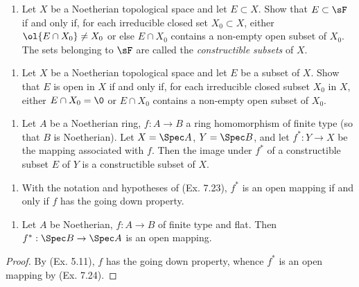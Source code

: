 \documentclass[12pt]{amsart}
\begin{document}
\begin{enumerate}
  \item[7.21] {
      Let $X$ be a Noetherian topological space and let $E\subset X$.
      Show that $E\subset \sF$ if and only if, for each irreducible closed set $X_0\subset X$, either $\ol{E\cap X_0}\neq X_0$ or else $E\cap X_0$ contains a non-empty open subset of $X_0$.
      The sets belonging to $\sF$ are called the \emph{constructible subsets} of $X$.
    }
\end{enumerate}

\begin{enumerate}
  \item[7.22] {
      Let $X$ be a Noetherian topological space and let $E$ be a subset of $X$.
      Show that $E$ is open in $X$ if and only if, for each irreducible closed subset $X_0$ in $X$, either $E\cap X_0=\0$ or $E\cap X_0$ contains a non-empty open subset of $X_0$.
    }
\end{enumerate}

\begin{enumerate}
  \item[7.23] {
      Let $A$ be a Noetherian ring, $f:A\to B$ a ring homomorphism of finite type (so that $B$ is Noetherian).
      Let $X=\Spec A$, $Y=\Spec B$, and let $f^*:Y\to X$ be the mapping associated with $f$.
      Then the image under $f^*$ of a constructible subset $E$ of $Y$ is a constructible subset of $X$.
    }
\end{enumerate}

\begin{enumerate}
  \item[7.24] {
      With the notation and hypotheses of (Ex. 7.23), $f^*$ is an open mapping if and only if $f$ has the going down property.
    }
\end{enumerate}

\begin{enumerate}
  \item[7.25] {
      Let $A$ be Noetherian, $f:A\to B$ of finite type and flat.
      Then $f^*:\Spec B\to \Spec A$ is an open mapping.
    }
\end{enumerate}

\begin{proof}
  By (Ex. 5.11), $f$ has the going down property, whence $f^*$ is an open mapping by (Ex. 7.24).
\end{proof}
\end{document}
